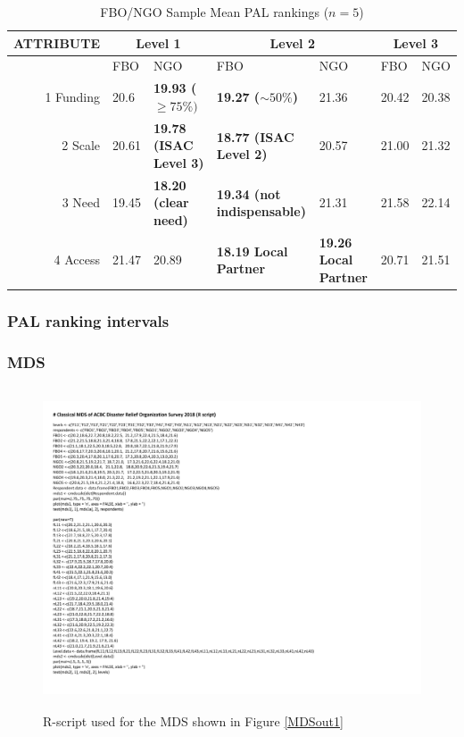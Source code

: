 \documentclass[a4paper, 12pt]{article}
\begin{document}
\begin{table}[!htpb]
	\centering
	\scriptsize
	\begin{tabular}{r|ll|ll|ll}
		ATTRIBUTE& \multicolumn{2}{c}{Level 1}&\multicolumn{2}{c}{Level 2}&\multicolumn{2}{c}{Level 3}\\\hline
		& FBO&NGO&FBO&NGO&FBO&NGO\\
		1 Funding &20.6&{\bf 19.93 ($\ge 75\%)$}&	{\bf 19.27 ($\sim 50\%$)}&21.36&	20.42&20.38\\
		2 Scale & 20.61&{\bf 19.78 (ISAC Level 3)}&	{\bf 18.77 (ISAC Level 2)}&20.57&	21.00&21.32\\
		3 Need & 19.45&{\bf 18.20 (clear need)}&	{\bf 19.34 (not indispensable)}&21.31&	21.58&22.14\\
		4 Access & 21.47&20.89&	{\bf 18.19 Local Partner}&{\bf 19.26 Local Partner} & 20.71&21.51\\\hline
	\end{tabular}
	\caption{FBO/NGO Sample Mean PAL rankings ($n=5$)}
	\label{PAL}
\end{table}
\subsubsection{PAL ranking intervals}


\subsubsection{MDS}
\begin{figure}[!htpb]
	\centering
	\includegraphics[width=5.5in, height=3.75in]{RScript.pdf}
	\caption{R-script used for the MDS shown in Figure \ref{MDSout1}}
	\label{AL}
\end{figure}
\end{document}
